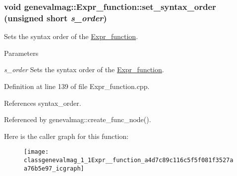 \hypertarget{classgenevalmag_1_1Expr__function_a4d7c89c116c5f5f081f3527aa76b5e97}{
\subsubsection[{set\_\-syntax\_\-order}]{\setlength{\rightskip}{0pt plus 5cm}void genevalmag::Expr\_\-function::set\_\-syntax\_\-order (unsigned short {\em s\_\-order})}}
\label{classgenevalmag_1_1Expr__function_a4d7c89c116c5f5f081f3527aa76b5e97}
Sets the syntax order of the \hyperlink{classgenevalmag_1_1Expr__function}{Expr\_\-function}. 
\begin{DoxyParams}{Parameters}
\item[{\em s\_\-order}]Sets the syntax order of the \hyperlink{classgenevalmag_1_1Expr__function}{Expr\_\-function}. \end{DoxyParams}


Definition at line 139 of file Expr\_\-function.cpp.



References syntax\_\-order.



Referenced by genevalmag::create\_\-func\_\-node().



Here is the caller graph for this function:\nopagebreak
\begin{figure}[H]
\begin{center}
\leavevmode
\texttt{[image: classgenevalmag\_1\_1Expr\_\_function\_a4d7c89c116c5f5f081f3527aa76b5e97\_icgraph]}
\end{center}
\end{figure}


